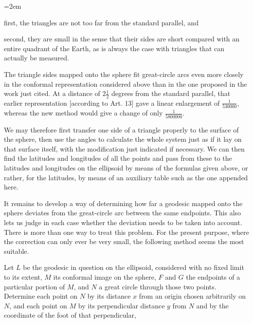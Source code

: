 \begin{list}{}{\leftmargin=2em\rightmargin=0pt\itemindent=0pt\itemsep=0pt\parsep=0pt}
\item first, the triangles are not too far from the standard parallel, and
\item second, they are small in the sense that their sides are short compared with an entire quadrant of the Earth, as is always the case with triangles that can actually be measured.
\end{list}
\noindent\hspace*{\parindent}The triangle sides mapped onto the sphere fit great-circle arcs even more closely in the conformal representation considered above than in the one proposed in the work just cited. At a distance of \(2\tfrac{1}{2}\) degrees from the standard parallel, that earlier representation [according to Art. 13] gave a linear enlargement of \(\tfrac{1}{530000}\), whereas the new method would give a change of only \(\tfrac{1}{5800000}\).

We may therefore first transfer one side of a triangle properly to the surface of the sphere, then use the angles to calculate the whole system just as if it lay on that surface itself, with the modification just indicated if necessary. We can then find the latitudes and longitudes of all the points and pass from these to the latitudes and longitudes on the ellipsoid by means of the formulas given above, or rather, for the latitudes, by means of an auxiliary table such as the one appended here.

\indent It remains to develop a way of determining how far a geodesic mapped onto the sphere deviates from the great-circle arc between the same endpoints. This also lets us judge in each case whether the deviation needs to be taken into account. There is more than one way to treat this problem. For the present purpose, where the correction can only ever be very small, the following method seems the most suitable.

Let \(L\) be the geodesic in question on the ellipsoid, considered with no fixed limit to its extent, \(M\) its conformal image on the sphere, \(F\) and \(G\) the endpoints of a particular portion of \(M\), and \(N\) a great circle through those two points. Determine each point on \(N\) by its distance \(x\) from an origin chosen arbitrarily on \(N\), and each point on \(M\) by its perpendicular distance \(y\) from \(N\) and by the coordinate of the foot of that perpendicular,

